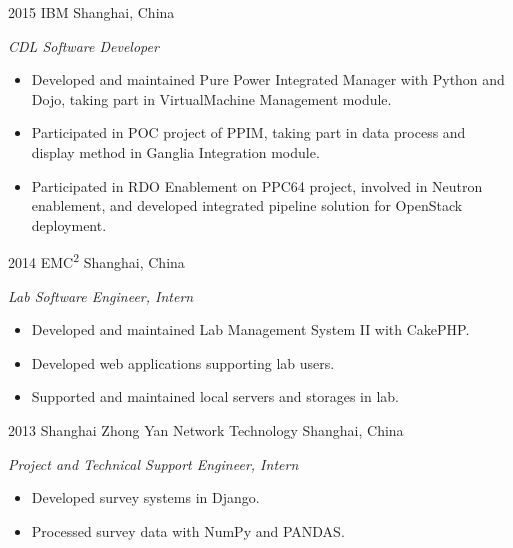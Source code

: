 \documentclass[]{friggeri-cv} %
\begin{document}
\begin{entrylist}
	\entry
	{2015}
	{IBM}
	{Shanghai, China}
	{\emph{CDL Software Developer}
		\begin{itemize}
			\item Developed and maintained Pure Power Integrated Manager with Python and Dojo, taking part in VirtualMachine Management module.
			\item Participated in POC project of PPIM, taking part in data process and display method in Ganglia Integration module.
			\item Participated in RDO Enablement on PPC64 project, involved in Neutron enablement, and developed integrated pipeline solution for OpenStack deployment.
		\end{itemize}
	}
	\entry
	{2014}
	{EMC\textsuperscript{2}}
	{Shanghai, China}
	{\emph{Lab Software Engineer, Intern}
		\begin{itemize}
			\item Developed and maintained Lab Management System II with CakePHP.
			\item Developed web applications supporting lab users.
			\item Supported and maintained local servers and storages in lab.
		\end{itemize}
	}
	\entry
	{2013}
	{Shanghai Zhong Yan Network Technology}
	{Shanghai, China}
	{\emph{Project and Technical Support Engineer, Intern}
		\begin{itemize}
			\item Developed survey systems in Django.
			\item Processed survey data with NumPy and PANDAS.
		\end{itemize}
	}
\end{entrylist}


%
\end{document}
